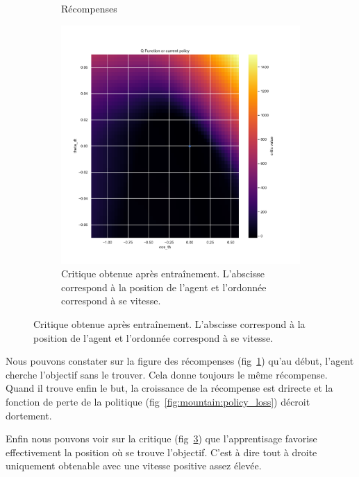 \begin{figure}[H]
\begin{subfigure}{0.45\textwidth}
        \caption{Récompenses}\label{fig:mountain:reward}
    \end{subfigure}
    \begin{subfigure}{0.45\textwidth}
        \includegraphics[width=\textwidth]{figures/mountain_car/0_critic_pg_q1_post_MountainCarContinuous-v0.pdf}
        \caption{Critique obtenue après entraînement. L'abscisse correspond à la position de l'agent et l'ordonnée correspond à se vitesse.}\label{fig:mountain:critic}
    \end{subfigure}
\end{figure}

Nous pouvons constater sur la figure des récompenses (fig~\ref{fig:mountain:reward}) qu'au début, l'agent cherche l'objectif sans le trouver. Cela donne toujours le même récompense. Quand il trouve enfin le but, la croissance de la récompense est drirecte et la fonction de perte de la politique (fig~\ref{fig:mountain:policy_loss}) décroit dortement.

Enfin nous pouvons voir sur la critique (fig~\ref{fig:mountain:critic}) que l'apprentisage favorise effectivement la position où se trouve l'objectif. C'est à dire tout à droite uniquement obtenable avec une vitesse positive assez élevée.